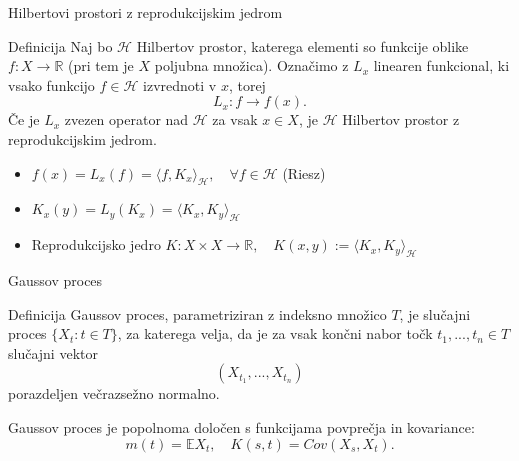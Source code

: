 \documentclass{beamer}
\begin{document}
\begin{frame}{Hilbertovi prostori z reprodukcijskim jedrom}
\begin{block}{Definicija}
Naj bo $\mathcal{H}$ Hilbertov prostor, katerega elementi so funkcije oblike $f: X \rightarrow \mathbb{R}$ (pri tem je $X$ poljubna množica). Označimo z $L_x$ linearen funkcional, ki vsako funkcijo $f \in \mathcal{H}$ izvrednoti v $x$, torej $$L_x : f \rightarrow f(x).$$ Če je $L_x$ zvezen operator nad $\mathcal{H}$ za vsak $x \in X$, je $\mathcal{H}$ Hilbertov prostor z reprodukcijskim jedrom.
\end{block}
\begin{itemize}
\item $f(x) = L_x(f) = \langle f, K_x \rangle_{\mathcal{H}}, \quad \forall f \in \mathcal{H}$ (Riesz)
\item $K_x(y) = L_y(K_x) = \langle K_x, K_y \rangle_{\mathcal{H}}$
\item Reprodukcijsko jedro $K: X \times X \rightarrow \mathbb{R}, \quad K(x,y) := \langle K_x, K_y \rangle_{\mathcal{H}}$
\end{itemize}
\end{frame}

\begin{frame}{Gaussov proces}
\begin{block}{Definicija}
Gaussov proces, parametriziran z indeksno množico $T$, je slučajni proces $\{X_t : t \in T\}$, za katerega velja, da je za vsak končni nabor točk $t_1,...,t_n \in T$ slučajni vektor
$$
(X_{t_1},...,X_{t_n})
$$
porazdeljen večrazsežno normalno.
\end{block}

Gaussov proces je popolnoma določen s funkcijama povprečja  in kovariance: 
$$m(t) = \mathbb{E}X_t, \quad K(s,t) = Cov(X_s,X_t).$$
\end{frame}
\end{document}
